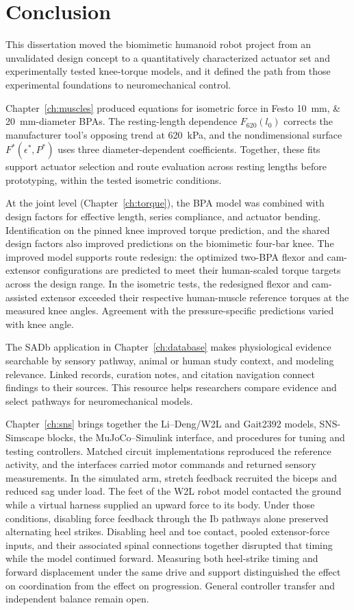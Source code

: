 \chapter{Conclusion}\label{ch:conclusion}
\graphicspath{{../Figures/80-conclusion/}{figs/80-conclusion/}}

This dissertation moved the biomimetic humanoid robot project from an unvalidated design concept to a quantitatively characterized actuator set and experimentally tested knee-torque models, and it defined the path from those experimental foundations to neuromechanical control.

Chapter~\ref{ch:muscles} produced equations for isometric force in Festo \qtylist{10;20}{\mm}-diameter BPAs. The resting-length dependence $F_{620}(l_0)$ corrects the manufacturer tool's opposing trend at \qty{620}{\kPa}, and the nondimensional surface $F^*(\epsilon^*,P^*)$ uses three diameter-dependent coefficients. Together, these fits support actuator selection and route evaluation across resting lengths before prototyping, within the tested isometric conditions.

At the joint level (Chapter~\ref{ch:torque}), the BPA model was combined with design factors for effective length, series compliance, and actuator bending. Identification on the pinned knee improved torque prediction, and the shared design factors also improved predictions on the biomimetic four-bar knee. The improved model supports route redesign: the optimized two-BPA flexor and cam-extensor configurations are predicted to meet their human-scaled torque targets across the design range. In the isometric tests, the redesigned flexor and cam-assisted extensor exceeded their respective human-muscle reference torques at the measured knee angles. Agreement with the pressure-specific predictions varied with knee angle.

The SADb application in Chapter~\ref{ch:database} makes physiological evidence searchable by sensory pathway, animal or human study context, and modeling relevance. Linked records, curation notes, and citation navigation connect findings to their sources. This resource helps researchers compare evidence and select pathways for neuromechanical models.

Chapter~\ref{ch:sns} brings together the Li--Deng/W2L and Gait2392 models, SNS-Simscape blocks, the MuJoCo--Simulink interface, and procedures for tuning and testing controllers. Matched circuit implementations reproduced the reference activity, and the interfaces carried motor commands and returned sensory measurements. In the simulated arm, stretch feedback recruited the biceps and reduced sag under load. The feet of the W2L robot model contacted the ground while a virtual harness supplied an upward force to its body. Under those conditions, disabling force feedback through the Ib pathways alone preserved alternating heel strikes. Disabling heel and toe contact, pooled extensor-force inputs, and their associated spinal connections together disrupted that timing while the model continued forward. Measuring both heel-strike timing and forward displacement under the same drive and support distinguished the effect on coordination from the effect on progression. General controller transfer and independent balance remain open.


